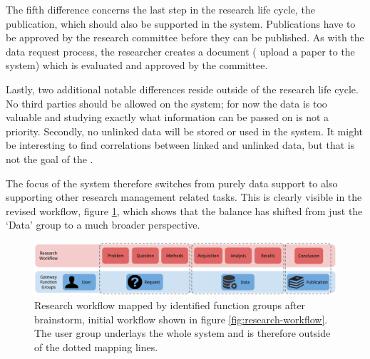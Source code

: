 The fifth difference concerns the last step in the research life cycle, the publication, which should also be supported in the system.
Publications have to be approved by the research committee before they can be published.
As with the data request process, the researcher creates a document (\ie{} upload a paper to the system) which is evaluated and approved by the committee.

Lastly, two additional notable differences reside outside of the research life cycle.
No third parties should be allowed on the system; for now the data is too valuable and studying exactly what information can be passed on is not a priority.
Secondly, no unlinked data will be stored or used in the system.
It might be interesting to find correlations between linked and unlinked data, but that is not the goal of the \project{}.

The focus of the system therefore switches from purely data support to also supporting other research management related tasks.
This is clearly visible in the revised workflow, figure \ref{fig:research-workflow-after}, which shows that the balance has shifted from just the `Data' group to a much broader perspective.

\begin{figure}[hb]
	\centering
	\includegraphics[width=0.98\linewidth]{images/research-workflow-after}
	\caption{
		Research workflow mapped by identified function groups after brainstorm, initial workflow shown in figure \ref{fig:research-workflow}.
		The user group underlays the whole system and is therefore outside of the dotted mapping lines.
	}
	\label{fig:research-workflow-after}
\end{figure}